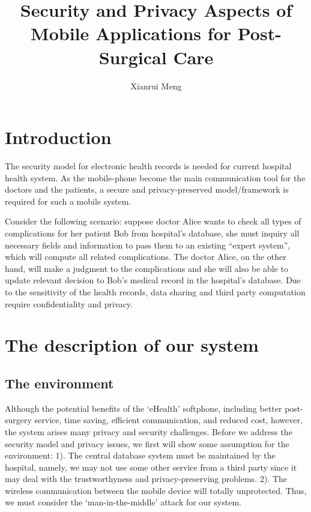 \documentclass[11pt]{article}
\title{\textbf{Security and Privacy Aspects of Mobile Applications for Post-Surgical Care}}
\author{Xianrui Meng}
\date{}
\newcommand{\xnote}[1]{}
\newcommand{\xnote}[1]{\marginpar{\textcolor{red}{\textbf{!!!}}}\textcolor{blue}{\sf #1 --X.M.}}
\begin{document}
\maketitle
\section{Introduction}
The security model for electronic health records is needed for current hospital health system. As the mobile-phone become the main communication tool for the doctors and the patients, a secure and privacy-preserved model/framework is required for such a mobile system.

Consider the following scenario: suppose doctor Alice wants to check all types of complications for her patient Bob from hospital's database, she must inquiry all necessary fields and information to pass them to an existing ``expert system'', which will compute all related complications. 
The doctor Alice, on the other hand, will make a judgment to the complications and she will also be able to update relevant decision to Bob's medical record in the hospital's database.
Due to the sensitivity of the health records, data sharing and third party computation require confidentiality and privacy.

\section{The description of our system}
\subsection{The environment}
Although the potential benefits of the `eHealth' softphone, including better post-surgery service, time saving, efficient communication, and reduced cost, however, the system arises many privacy and security challenges. Before we address the security model and privacy issues, we first will show some assumption for the  environment: 1). The central database system must be maintained by the hospital, namely, we may not use some other service from a third party since it may deal with the trustworthyness and privacy-preserving problems. 2). The wireless communication between the mobile device will totally unprotected. Thus, we must consider the `man-in-the-middle' attack for our system. 
\end{document}
